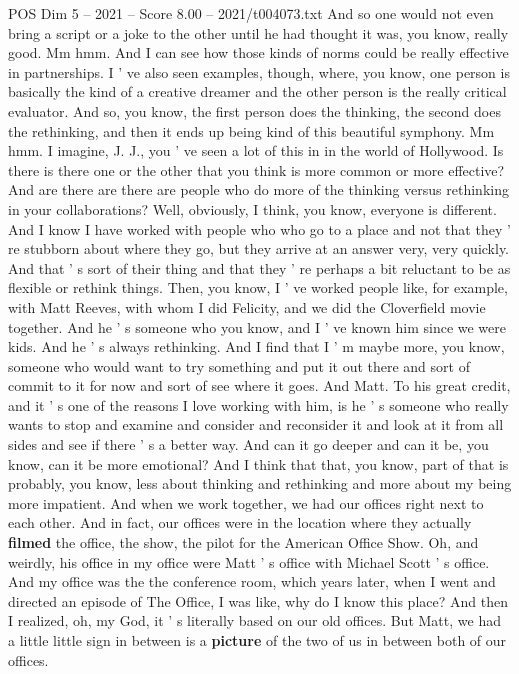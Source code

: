 \begin{textsample}{POS Dim 5 – 2021 – Score 8.00 – 2021/t004073.txt}
And so one would not even bring a script or a joke to the other until he had thought it was, you know, really good.
Mm hmm.
And I can see how those kinds of norms could be really effective in partnerships.
I ' ve also seen examples, though, where, you know, one person is basically the kind of a creative dreamer and the other person is the really critical evaluator.
And so, you know, the first person does the thinking, the second does the rethinking, and then it ends up being kind of this beautiful symphony.
Mm hmm.
I imagine, J.
J., you ' ve seen a lot of this in in the world of Hollywood.
Is there is there one or the other that you think is more common or more effective?
And are there are there are people who do more of the thinking versus rethinking in your collaborations?
Well, obviously, I think, you know, everyone is different.
And I know I have worked with people who who go to a place and not that they ' re stubborn about where they go, but they arrive at an answer very, very quickly.
And that ' s sort of their thing and that they ' re perhaps a bit reluctant to be as flexible or rethink things.
Then, you know, I ' ve worked people like, for example, with Matt Reeves, with whom I did Felicity, and we did the Cloverfield movie together.
And he ' s someone who you know, and I ' ve known him since we were kids.
And he ' s always rethinking.
And I find that I ' m maybe more, you know, someone who would want to try something and put it out there and sort of commit to it for now and sort of see where it goes.
And Matt.
To his great credit, and it ' s one of the reasons I love working with him, is he ' s someone who really wants to stop and examine and consider and reconsider it and look at it from all sides and see if there ' s a better way.
And can it go deeper and can it be, you know, can it be more emotional?
And I think that that, you know, part of that is probably, you know, less about thinking and rethinking and more about my being more impatient.
And when we work together, we had our offices right next to each other.
And in fact, our offices were in the location where they actually \textbf{filmed} the office, the show, the pilot for the American Office Show.
Oh, and weirdly, his office in my office were Matt ' s office with Michael Scott ' s office.
And my office was the the conference room, which years later, when I went and directed an episode of The Office, I was like, why do I know this place?
And then I realized, oh, my God, it ' s literally based on our old offices.
But Matt, we had a little little sign in between is a \textbf{picture} of the two of us in between both of our offices.

\end{textsample}
